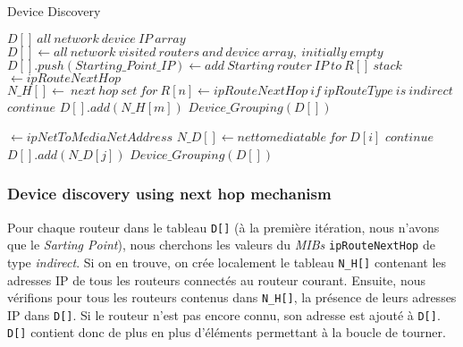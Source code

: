 {\selectfont
\begin{center}
\begin{algorithm}
\caption{Device Discovery}
\label{device_discovery}

\begin{algorithmic}[1]
\Ensure $D[] ~ all~ network~ device~ IP~array$
 \State $D[] \gets all~ network~ visited~ routers~ and~ device~ array,~ initially~ empty$
 \State $D[].push(Starting\_Point\_IP) \gets add~ Starting~ router~ IP~ to~ R[]~ stack $
      $\gets ipRouteNextHop$
      \State $N\_H[] \gets ~next~ hop~ set~ for~ R[n] \gets ipRouteNextHop~ if~ ipRouteType~ is~ indirect$
        \State $continue$
       \Else
        \State $D[].add(N\_H[m])$
        \State $Device\_Grouping(D[])$
       \EndIf      
       
      \EndFor
      \EndIf
    \EndFunction
   \EndFor
   
     $\gets ipNetToMediaNetAddress $
     \State $N\_D[] \gets nettomediatable~ for~ D[i] $
       \State $continue$
      \Else
       \State $D[].add(N\_D[j])$
       \State $Device\_Grouping(D[])$
      \EndIf
     \EndFor
    \EndIf
   \EndFor
  \EndFunction
    
\EndFunction

\end{algorithmic}

\end{algorithm}
\end{center}
}

\subsubsection{Device discovery using next hop mechanism}
Pour chaque routeur dans le tableau \texttt{D[]} (à la première itération, nous n'avons que le \emph{Sarting Point}), nous cherchons les valeurs du \emph{MIBs} \texttt{ipRouteNextHop} de type \emph{indirect}. Si on en trouve, on crée localement le tableau \texttt{N\_H[]} contenant les adresses IP de tous les routeurs connectés au routeur courant. Ensuite, nous vérifions pour tous les routeurs contenus dans \texttt{N\_H[]}, la présence de leurs adresses IP dans \texttt{D[]}. Si le routeur n'est pas encore connu, son adresse est ajouté à \texttt{D[]}. \texttt{D[]} contient donc de plus en plus d'éléments permettant à la boucle de tourner. 

